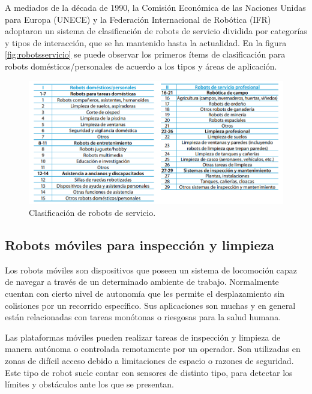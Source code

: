 A mediados de la década de 1990, la Comisión Económica de las Naciones Unidas para Europa (UNECE) \citep{UNECE} y la Federación Internacional de Robótica (IFR) \citep{IFR} adoptaron un sistema de clasificación de robots de servicio dividida por categorías y tipos de interacción, que se ha mantenido hasta la actualidad. En la  figura \ref{fig:robotsservicio} se puede observar los primeros ítems de clasificación para robots domésticos/personales de acuerdo a los tipos y áreas de aplicación.
\pagebreak


\begin{figure}[h]
	\centering
	\includegraphics[width=\textwidth]{./Figures/clasificacion.png}
	\caption{Clasificación de robots de servicio\protect\footnotemark.}
	\label{fig:clasificacion}
\end{figure}




\subsection{Robots móviles para inspección y limpieza}

Los robots móviles son dispositivos que poseen un sistema de locomoción capaz de navegar a través de un determinado ambiente de trabajo. Normalmente cuentan con cierto nivel de autonomía que les permite el desplazamiento sin colisiones por un recorrido específico. Sus aplicaciones son muchas y en general  están relacionadas con tareas monótonas o riesgosas para la salud humana.

Las plataformas móviles pueden realizar tareas de inspección y limpieza de manera autónoma o controlada remotamente por un operador. Son utilizadas en zonas de difícil acceso debido a limitaciones de espacio o razones de seguridad. Este tipo de robot suele contar con sensores de distinto tipo, para detectar los límites y obstáculos ante los que se presentan.
 
